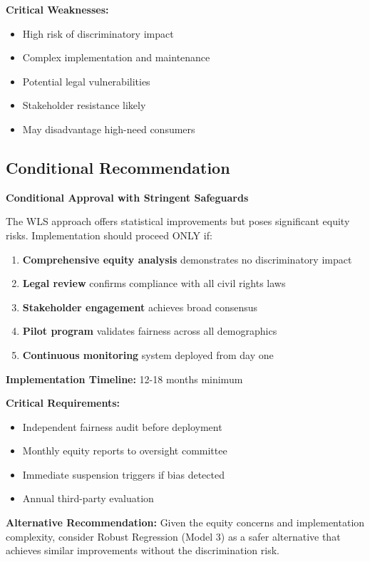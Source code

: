 \textbf{Critical Weaknesses:}
\begin{itemize}
    \item High risk of discriminatory impact
    \item Complex implementation and maintenance
    \item Potential legal vulnerabilities
    \item Stakeholder resistance likely
    \item May disadvantage high-need consumers
\end{itemize}

\subsection{Conditional Recommendation}

\textbf{Conditional Approval with Stringent Safeguards}

The WLS approach offers statistical improvements but poses significant equity risks. Implementation should proceed ONLY if:

\begin{enumerate}
    \item \textbf{Comprehensive equity analysis} demonstrates no discriminatory impact
    \item \textbf{Legal review} confirms compliance with all civil rights laws
    \item \textbf{Stakeholder engagement} achieves broad consensus
    \item \textbf{Pilot program} validates fairness across all demographics
    \item \textbf{Continuous monitoring} system deployed from day one
\end{enumerate}

\textbf{Implementation Timeline:} 12-18 months minimum

\textbf{Critical Requirements:}
\begin{itemize}
    \item Independent fairness audit before deployment
    \item Monthly equity reports to oversight committee
    \item Immediate suspension triggers if bias detected
    \item Annual third-party evaluation
\end{itemize}

\textbf{Alternative Recommendation:} Given the equity concerns and implementation complexity, consider Robust Regression (Model 3) as a safer alternative that achieves similar improvements without the discrimination risk.
